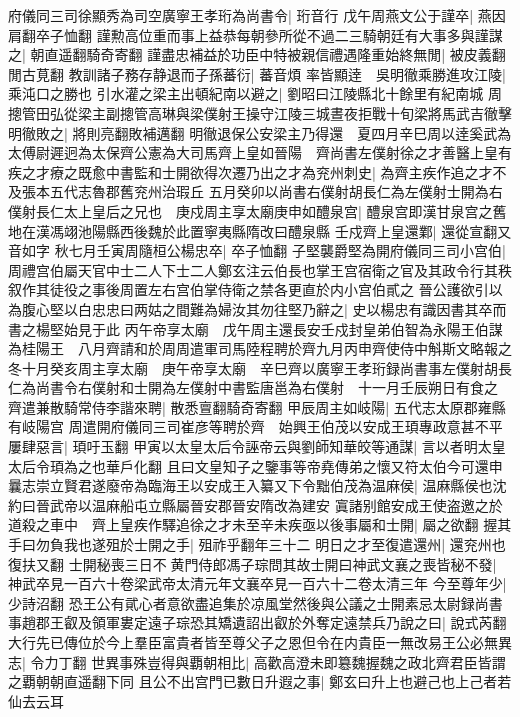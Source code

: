 府儀同三司徐顯秀為司空廣寧王孝珩為尚書令|{
	珩音行}
戊午周燕文公于謹卒|{
	燕因肩翻卒子恤翻}
謹勲高位重而事上益恭每朝參所從不過二三騎朝廷有大事多與謹謀之|{
	朝直遥翻騎奇寄翻}
謹盡忠補益於功臣中特被親信禮遇隆重始終無閒|{
	被皮義翻閒古莧翻}
教訓諸子務存静退而子孫蕃衍|{
	蕃音煩}
率皆顯逹　吳明徹乘勝進攻江陵|{
	乘沌口之勝也}
引水灌之梁主出頓紀南以避之|{
	劉昭曰江陵縣北十餘里有紀南城}
周摠管田弘從梁主副摠管高琳與梁僕射王操守江陵三城晝夜拒戰十旬梁將馬武吉徹擊明徹敗之|{
	將則亮翻敗補邁翻}
明徹退保公安梁主乃得還　夏四月辛巳周以逹奚武為太傅尉遲迥為太保齊公憲為大司馬齊上皇如晉陽　齊尚書左僕射徐之才善醫上皇有疾之才療之既愈中書監和士開欲得次遷乃出之才為兖州刺史|{
	為齊主疾作追之才不及張本五代志魯郡舊兖州治瑕丘}
五月癸卯以尚書右僕射胡長仁為左僕射士開為右僕射長仁太上皇后之兄也　庚戍周主享太廟庚申如醴泉宫|{
	醴泉宫即漢甘泉宫之舊地在漢馮翊池陽縣西後魏於此置寧夷縣隋改曰醴泉縣}
壬戍齊上皇還鄴|{
	還從宣翻又音如字}
秋七月壬寅周隨桓公楊忠卒|{
	卒子恤翻}
子堅襲爵堅為開府儀同三司小宫伯|{
	周禮宫伯屬天官中士二人下士二人鄭玄注云伯長也掌王宫宿衛之官及其政令行其秩叙作其徒役之事後周置左右宫伯掌侍衛之禁各更直於内小宫伯貳之}
晉公護欲引以為腹心堅以白忠忠曰两姑之間難為婦汝其勿往堅乃辭之|{
	史以楊忠有識因書其卒而書之楊堅始見于此}
丙午帝享太廟　戊午周主還長安壬戍封皇弟伯智為永陽王伯謀為桂陽王　八月齊請和於周周遣軍司馬陸程聘於齊九月丙申齊使侍中斛斯文略報之　冬十月癸亥周主享太廟　庚午帝享太廟　辛巳齊以廣寧王孝珩録尚書事左僕射胡長仁為尚書令右僕射和士開為左僕射中書監唐邕為右僕射　十一月壬辰朔日有食之　齊遣兼散騎常侍李諧來聘|{
	散悉亶翻騎奇寄翻}
甲辰周主如岐陽|{
	五代志太原郡雍縣有岐陽宫}
周遣開府儀同三司崔彦等聘於齊　始興王伯茂以安成王頊專政意甚不平屢肆惡言|{
	頊吁玉翻}
甲寅以太皇太后令誣帝云與劉師知華皎等通謀|{
	言以者明太皇太后令頊為之也華戶化翻}
且曰文皇知子之鑒事等帝堯傳弟之懷又符太伯今可還申曩志崇立賢君遂廢帝為臨海王以安成王入纂又下令黜伯茂為温麻侯|{
	温麻縣侯也沈約曰晉武帝以温麻船屯立縣屬晉安郡晉安隋改為建安}
寘諸别館安成王使盗邀之於道殺之車中　齊上皇疾作驛追徐之才未至辛未疾亟以後事屬和士開|{
	屬之欲翻}
握其手曰勿負我也遂殂於士開之手|{
	殂祚乎翻年三十二}
明日之才至復遣還州|{
	還兖州也復扶又翻}
士開秘喪三日不黄門侍郎馮子琮問其故士開曰神武文襄之喪皆秘不發|{
	神武卒見一百六十卷梁武帝太清元年文襄卒見一百六十二卷太清三年}
今至尊年少|{
	少詩沼翻}
恐王公有貮心者意欲盡追集於凉風堂然後與公議之士開素忌太尉録尚書事趙郡王叡及領軍婁定遠子琮恐其矯遺詔出叡於外奪定遠禁兵乃說之曰|{
	說式芮翻}
大行先已傳位於今上羣臣富貴者皆至尊父子之恩但令在内貴臣一無改易王公必無異志|{
	令力丁翻}
世異事殊豈得與覇朝相比|{
	高歡高澄未即簒魏握魏之政北齊君臣皆謂之覇朝朝直遥翻下同}
且公不出宫門已數日升遐之事|{
	鄭玄曰升上也避己也上己者若仙去云耳}
